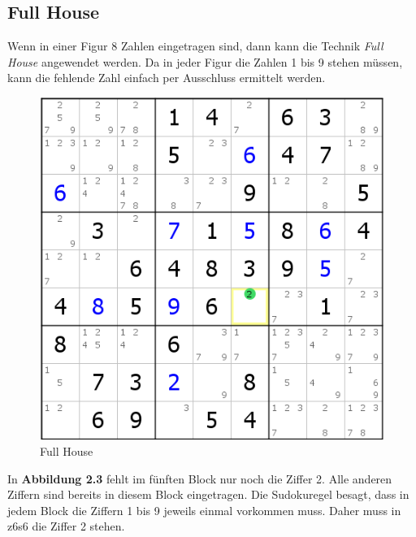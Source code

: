 \newpage
\subsection{Full House}
\label{Full_House}
Wenn in einer Figur 8 Zahlen eingetragen sind, dann kann die Technik \textit{Full House} angewendet werden. Da in jeder Figur die Zahlen 1 bis 9 stehen müssen, kann die fehlende Zahl einfach per Ausschluss ermittelt werden.\\

\begin{figure}[h]
\begin{center}
\includegraphics{./img/full_house.png}
\caption{Full House}
\end{center}
\end{figure}

\noindent In \textbf{Abbildung 2.3} fehlt im fünften Block nur noch die Ziffer 2. Alle anderen Ziffern sind bereits in diesem Block eingetragen. Die Sudokuregel besagt, dass in jedem Block die Ziffern 1 bis 9 jeweils einmal vorkommen muss. Daher muss in z6s6 die Ziffer 2 stehen.